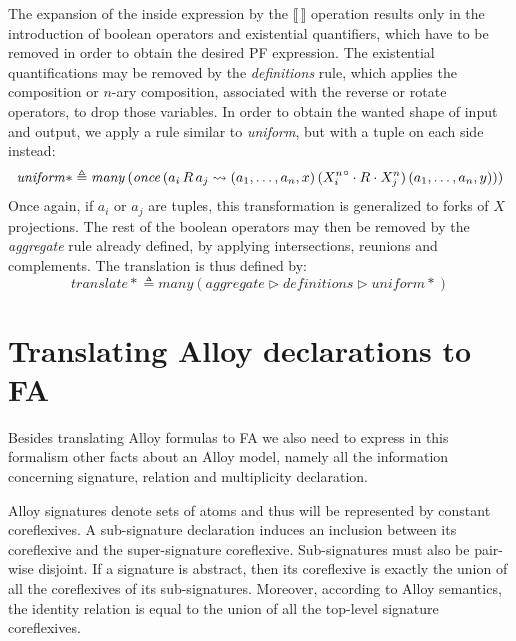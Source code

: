 \documentclass{llncs}
\begin{document}
The expansion of the inside expression by the $\llbracket \, \rrbracket$ operation results only in the introduction of boolean operators and existential quantifiers, which have to be removed in order to obtain the desired PF expression. The existential quantifications may be removed by the \emph{definitions} rule, which applies the composition or $n$-ary composition, associated with the reverse or rotate operators, to drop those variables. In order to obtain the wanted shape of input and output, we apply a rule similar to \emph{uniform}, but with a tuple on each side instead:
\begin{equation*}
\mathit{uniform*} \triangleq \mathit{many} \, (\mathit{once} \, (a_i \, R \, a_j \rightsquigarrow (a_1, \dots, a_n, x) \, ({X^{n}_i}^\circ \cdot R \cdot X^{n}_j) \, (a_1, \dots,a_n, y))) \notag
\end{equation*}
Once again, if $a_i$ or $a_j$ are tuples, this transformation is generalized to forks of $X$ projections. The rest of the boolean operators may then be removed by the \emph{aggregate} rule already defined, by applying intersections, reunions and complements. The translation is thus defined by:
\begin{equation}
	\mathit{translate*} \triangleq \mathit{many} (\mathit{aggregate} \triangleright \mathit{definitions} \triangleright \mathit{uniform*})
\end{equation}

\section{Translating Alloy declarations to FA}
\label{sec:alloydecls}

Besides translating Alloy formulas to FA we also need to express in
this formalism other facts about an Alloy model, namely all the
information concerning signature, relation and multiplicity
declaration.

Alloy signatures denote sets of atoms and thus will be represented by
constant coreflexives. A sub-signature declaration induces an
inclusion between its coreflexive and the super-signature
coreflexive. Sub-signatures must also be pair-wise disjoint. If a
signature is abstract, then its coreflexive is exactly the union of
all the coreflexives of its sub-signatures. Moreover, according to
Alloy semantics, the identity relation is equal to the union of all the
top-level signature coreflexives.
\end{document}
